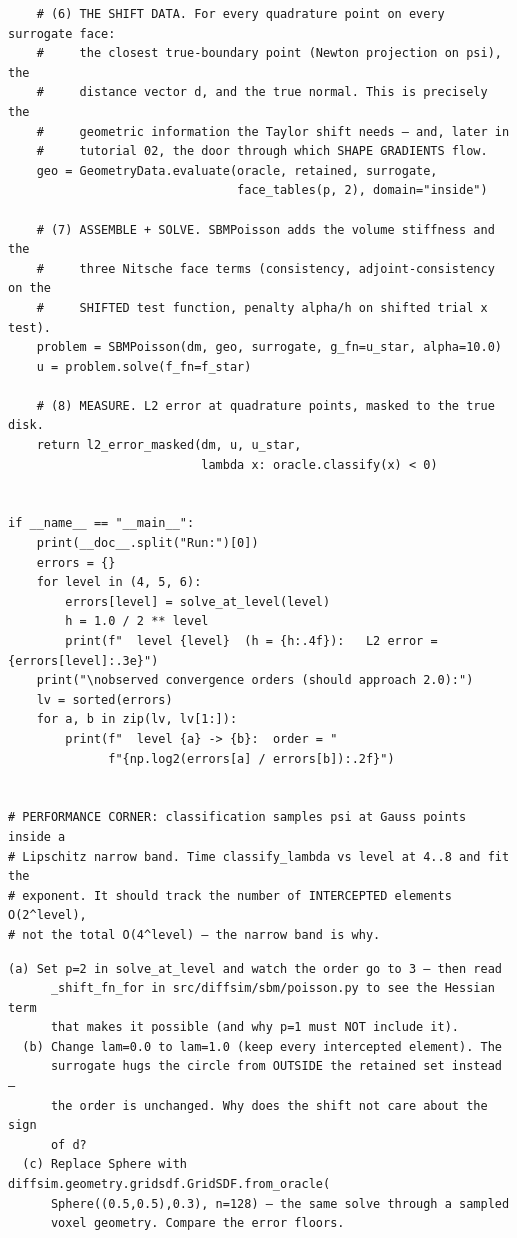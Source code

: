\begin{lstlisting}
    # (6) THE SHIFT DATA. For every quadrature point on every surrogate face:
    #     the closest true-boundary point (Newton projection on psi), the
    #     distance vector d, and the true normal. This is precisely the
    #     geometric information the Taylor shift needs — and, later in
    #     tutorial 02, the door through which SHAPE GRADIENTS flow.
    geo = GeometryData.evaluate(oracle, retained, surrogate,
                                face_tables(p, 2), domain="inside")

    # (7) ASSEMBLE + SOLVE. SBMPoisson adds the volume stiffness and the
    #     three Nitsche face terms (consistency, adjoint-consistency on the
    #     SHIFTED test function, penalty alpha/h on shifted trial x test).
    problem = SBMPoisson(dm, geo, surrogate, g_fn=u_star, alpha=10.0)
    u = problem.solve(f_fn=f_star)

    # (8) MEASURE. L2 error at quadrature points, masked to the true disk.
    return l2_error_masked(dm, u, u_star,
                           lambda x: oracle.classify(x) < 0)


if __name__ == "__main__":
    print(__doc__.split("Run:")[0])
    errors = {}
    for level in (4, 5, 6):
        errors[level] = solve_at_level(level)
        h = 1.0 / 2 ** level
        print(f"  level {level}  (h = {h:.4f}):   L2 error = {errors[level]:.3e}")
    print("\nobserved convergence orders (should approach 2.0):")
    lv = sorted(errors)
    for a, b in zip(lv, lv[1:]):
        print(f"  level {a} -> {b}:  order = "
              f"{np.log2(errors[a] / errors[b]):.2f}")


# PERFORMANCE CORNER: classification samples psi at Gauss points inside a
# Lipschitz narrow band. Time classify_lambda vs level at 4..8 and fit the
# exponent. It should track the number of INTERCEPTED elements O(2^level),
# not the total O(4^level) — the narrow band is why.
\end{lstlisting}

\begin{explore}
\begin{verbatim}
(a) Set p=2 in solve_at_level and watch the order go to 3 — then read
      _shift_fn_for in src/diffsim/sbm/poisson.py to see the Hessian term
      that makes it possible (and why p=1 must NOT include it).
  (b) Change lam=0.0 to lam=1.0 (keep every intercepted element). The
      surrogate hugs the circle from OUTSIDE the retained set instead —
      the order is unchanged. Why does the shift not care about the sign
      of d?
  (c) Replace Sphere with diffsim.geometry.gridsdf.GridSDF.from_oracle(
      Sphere((0.5,0.5),0.3), n=128) — the same solve through a sampled
      voxel geometry. Compare the error floors.
\end{verbatim}
\end{explore}
